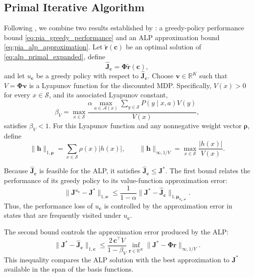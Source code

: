 \documentclass[sglanonrev]{informs4}
\providecommand{\bJ}{\boldsymbol{J}}
\providecommand{\bPhi}{\boldsymbol{\Phi}}
\providecommand{\bc}{\boldsymbol{c}}
\providecommand{\bmu}{\boldsymbol{\mu}}
\providecommand{\bnu}{\boldsymbol{\nu}}
\providecommand{\br}{\boldsymbol{r}}
\providecommand{\bv}{\boldsymbol{v}}
\begin{document}
\clearpage
\begin{APPENDICES}
\small


\section{Primal Iterative Algorithm}
\label{app:pia_algorithm}


Following \citet{le2004choose}, we combine two results established by \citet{de2003linear}: a greedy-policy performance bound \eqref{eq:pia_greedy_performance} and  an \ac{ALP} approximation bound \eqref{eq:pia_alp_approximation}. Let $\widetilde{\br}(\bc)$ be an optimal solution of \eqref{eq:alp_primal_expanded}, define
\[
\widehat{\bJ}_{\bc}
=
\bPhi\widetilde{\br}(\bc),
\]
and let $u_{\bc}$ be a greedy policy with respect to $\widehat{\bJ}_{\bc}$. Choose $\bv\in\mathbb R^K$ such that $V=\bPhi\bv$ is a Lyapunov
function for the discounted \ac{MDP}. Specifically, $V(x)>0$ for every $x\in\mathcal S$, and its associated Lyapunov constant,
\[
\beta_V
=
\max_{x\in\mathcal S}
\frac{
\alpha\displaystyle\max_{a\in\mathcal A(x)}
\sum_{y\in\mathcal S}P(y\mid x,a)V(y)}
{V(x)},
\]
satisfies $\beta_V<1$. For this Lyapunov function and any nonnegative weight vector $\boldsymbol\rho$, define
\[
\|\boldsymbol h\|_{1,\boldsymbol\rho}
=
\sum_{x\in\mathcal S}\rho(x)|h(x)|,
\qquad
\|\boldsymbol h\|_{\infty,1/V}
=
\max_{x\in\mathcal S}\frac{|h(x)|}{V(x)}.
\]

Because $\widehat{\bJ}_{\bc}$ is feasible for the \ac{ALP}, it satisfies $\widehat{\bJ}_{\bc}\leq\bJ^*$. The first bound relates the performance
of its greedy policy to its value-function approximation error:
\begin{equation}
\label{eq:pia_greedy_performance}
\|\bJ^{u_{\bc}}-\bJ^*\|_{1,\bnu}
\leq
\frac{1}{1-\alpha}
\|\bJ^*-\widehat{\bJ}_{\bc}\|_{1,\bmu_{u_{\bc},\bnu}}.
\end{equation}
Thus, the performance loss of $u_{\bc}$ is controlled by the approximation error in states that are frequently visited under $u_{\bc}$.

The second bound controls the approximation error produced by the \ac{ALP}:
\begin{equation}
\label{eq:pia_alp_approximation}
\|\bJ^*-\widehat{\bJ}_{\bc}\|_{1,\bc}
\leq
\frac{2\,\bc^\top V}{1-\beta_V}
\inf_{\br\in\mathbb R^K}
\|\bJ^*-\bPhi\br\|_{\infty,1/V}.
\end{equation}
This inequality compares the \ac{ALP} solution with the best approximation to $\bJ^*$ available in the span of the basis functions.


\end{APPENDICES}
\end{document}
